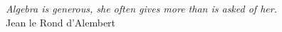 \vspace*{\fill}
\begin{flushright}
    \textit{Algebra is generous, she often gives more than is asked of her.}\\
    Jean le Rond d'Alembert
\end{flushright}